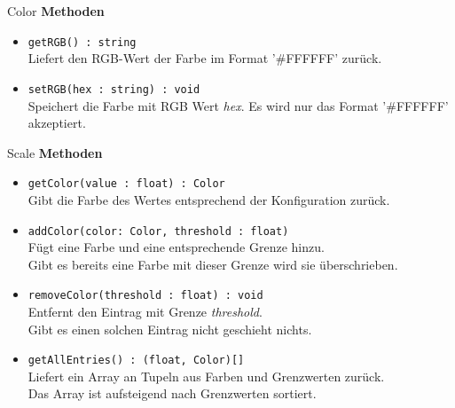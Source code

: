     \begin{Class}{Color}
        \textbf{Methoden}
        \begin{itemize}
            \item \texttt{getRGB() : string}
            \\ Liefert den RGB-Wert der Farbe im Format '\#FFFFFF' zurück.
            \item \texttt{setRGB(hex : string) : void}
            \\ Speichert die Farbe mit RGB Wert \emph{hex}. Es wird nur das Format '\#FFFFFF' akzeptiert.
        \end{itemize}
    \end{Class}

    \begin{Class}{Scale}
        \textbf{Methoden}
        \begin{itemize}
            \item \texttt{getColor(value : float) : Color}
            \\ Gibt die Farbe des Wertes entsprechend der Konfiguration zurück.
            \item \texttt{addColor(color: Color, threshold : float)}
            \\ Fügt eine Farbe und eine entsprechende Grenze hinzu.
            \\ Gibt es bereits eine Farbe mit dieser Grenze wird sie überschrieben.
            \item \texttt{removeColor(threshold : float) : void}
            \\ Entfernt den Eintrag mit Grenze \emph{threshold}.
            \\ Gibt es einen solchen Eintrag nicht geschieht nichts.
            \item \texttt{getAllEntries() : (float, Color)[]}
            \\ Liefert ein Array an Tupeln aus Farben und Grenzwerten zurück.
            \\ Das Array ist aufsteigend nach Grenzwerten sortiert.
        \end{itemize}
    \end{Class}